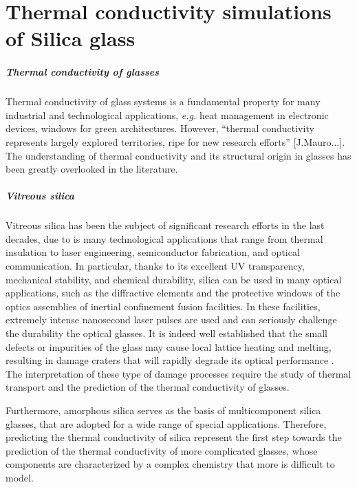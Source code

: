\chapter{Thermal conductivity simulations of Silica glass}


\paragraph{Thermal conductivity of glasses}
Thermal conductivity of glass systems is a fundamental property for many industrial and technological applications, \emph{e.g.} heat management in electronic devices, windows for green architectures.
However, ``thermal conductivity represents largely explored territories, ripe for new research efforts'' [J.Mauro...]\cite{MauroFM14,Mauro2014}. The understanding of thermal conductivity and its structural origin in glasses has been greatly overlooked in the literature. 

\paragraph{Vitreous silica}
Vitreous silica has been the subject of significant research efforts in the last decades, due to is many technological applications that range from thermal insulation to laser engineering, semiconductor fabrication, and optical communication.
In particular, thanks to its excellent UV transparency, mechanical stability, and chemical durability, silica can be used in many optical applications, such as the diffractive elements and the protective windows of the optics assemblies of inertial confinement fusion facilities. In these facilities, extremely intense nanosecond laser pulses are used and can seriously challenge the durability the optical glasses. It is indeed well established that the small defects or impurities of the glass may cause local lattice heating and melting, resulting in damage craters that will rapidly degrade its optical performance \cite{Miller2004,Canaud2004,Miller2010,Chambonneau2014,Kuzuu1999,Stuart1995,Wong2006,Carr2010,Saito2000}. The interpretation of these type of damage processes require the study of thermal transport and the prediction of the thermal conductivity of glasses. 

Furthermore, amorphous silica serves as the basis of multicomponent silica glasses, that are adopted for a wide range of special applications. 
Therefore, predicting the thermal conductivity of silica represent the first step towards the prediction of the thermal conductivity of more complicated glasses, whose components are characterized by a complex chemistry that more is difficult to model.

